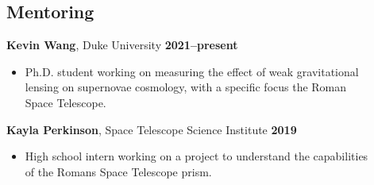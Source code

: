 \documentclass[margin]{res}
\begin{document}
\begin{resume}





\section{Mentoring} %

\textbf{Kevin Wang}, Duke University \hfill \textbf{2021--present}
\begin{itemize}\itemsep -2pt
    \item[] Ph.D. student working on measuring the effect of weak gravitational\\lensing on supernovae cosmology, with a specific focus the Roman\\Space Telescope.
    \end{itemize}
    \vspace{-12pt}
\textbf{Kayla Perkinson}, Space Telescope Science Institute \hfill \textbf{2019}
    \begin{itemize}\itemsep -2pt
    \item[] High school intern working on a project to understand the capabilities\\of the Romans Space Telescope prism.
    \end{itemize}


\end{resume}
\end{document}
